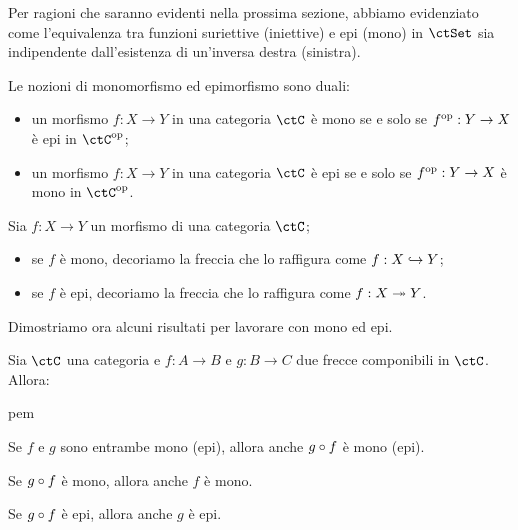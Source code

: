 Per ragioni che saranno evidenti nella prossima sezione,
abbiamo evidenziato come l'equivalenza tra funzioni suriettive (iniettive)
e epi (mono) in \(\ctSet\) sia indipendente dall'esistenza di un'inversa destra (sinistra).
\begin{remark}
\end{remark}
\begin{remark}
	\label{rmk:mono-epi-duality}
	Le nozioni di monomorfismo ed epimorfismo sono duali:
	\begin{itemize}
		\item un morfismo \(f : X\to Y\) in una categoria \(\ctC\) è mono se e solo se \(f^{\text{op}} : Y\to X\) è epi in \(\ctC^{\op}\);
		\item un morfismo \(f : X\to Y\) in una categoria \(\ctC\) è epi se e solo se \(f^{\text{op}} : Y\to X\) è mono in \(\ctC^{\op}\).
	\end{itemize}
\end{remark}
\begin{notation}
	Sia \(f : X\to Y\) un morfismo di una categoria \(\ctC\);
	\begin{itemize}
		\item se \(f\) è mono, decoriamo la freccia che lo raffigura come \(f : X\hookrightarrow Y\);
		\item se \(f\) è epi, decoriamo la freccia che lo raffigura come \(f : X\twoheadrightarrow Y\).
	\end{itemize}
\end{notation}
Dimostriamo ora alcuni risultati per lavorare con mono ed epi.
\begin{proposition}\label{canc_monoepi}
	Sia \(\ctC\) una categoria e \(f \colon A \to B\) e \(g \colon B \to C\) due frecce componibili in \(\ctC\).
	Allora:
	\begin{enumtag}{pem}
		\item \label{pem_1} Se \(f\) e \(g\) sono entrambe mono (epi), allora anche \(g \circ f\) è mono (epi).
		\item \label{pem_2} Se \(g \circ f\) è mono, allora anche \(f\) è mono.
		\item \label{pem_3} Se \(g \circ f\) è epi, allora anche \(g\) è epi.
	\end{enumtag}
\end{proposition}
